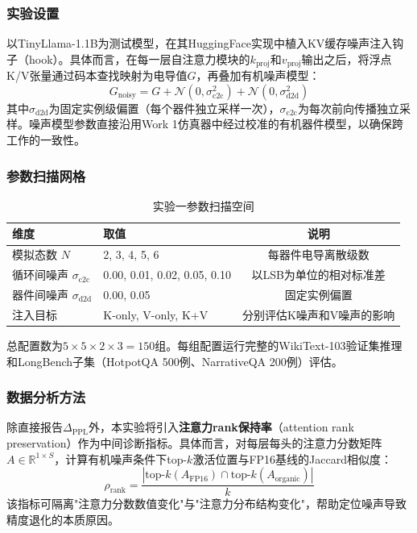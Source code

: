 \subsubsection{实验设置}

以TinyLlama-1.1B为测试模型，在其HuggingFace实现中植入KV缓存噪声注入钩子（hook）。具体而言，在每一层自注意力模块的$k_{\text{proj}}$和$v_{\text{proj}}$输出之后，将浮点K/V张量通过码本查找映射为电导值$G$，再叠加有机噪声模型：
\begin{equation}
G_{\text{noisy}} = G + \mathcal{N}(0, \sigma_{\text{c2c}}^2) + \mathcal{N}(0, \sigma_{\text{d2d}}^2)
\label{eq:noise_model}
\end{equation}
其中$\sigma_{\text{d2d}}$为固定实例级偏置（每个器件独立采样一次），$\sigma_{\text{c2c}}$为每次前向传播独立采样。噪声模型参数直接沿用Work 1仿真器中经过校准的有机器件模型，以确保跨工作的一致性。

\subsubsection{参数扫描网格}

\begin{table}[htbp]
\centering
\caption{实验一参数扫描空间}
\label{tab:exp1_grid}
\begin{tabular}{llc}
\toprule
维度 & 取值 & 说明 \\
\midrule
模拟态数 $N$ & 2, 3, 4, 5, 6 & 每器件电导离散级数 \\
循环间噪声 $\sigma_{\text{c2c}}$ & 0.00, 0.01, 0.02, 0.05, 0.10 & 以LSB为单位的相对标准差 \\
器件间噪声 $\sigma_{\text{d2d}}$ & 0.00, 0.05 & 固定实例偏置 \\
注入目标 & K-only, V-only, K+V & 分别评估K噪声和V噪声的影响 \\
\bottomrule
\end{tabular}
\end{table}

总配置数为$5 \times 5 \times 2 \times 3 = 150$组。每组配置运行完整的WikiText-103验证集推理和LongBench子集（HotpotQA 500例、NarrativeQA 200例）评估。

\subsubsection{数据分析方法}

除直接报告$\Delta_{\text{PPL}}$外，本实验将引入\textbf{注意力rank保持率}（attention rank preservation）作为中间诊断指标。具体而言，对每层每头的注意力分数矩阵$A \in \mathbb{R}^{1 \times S}$，计算有机噪声条件下top-$k$激活位置与FP16基线的Jaccard相似度：
\begin{equation}
\rho_{\text{rank}} = \frac{|\text{top-}k(A_{\text{FP16}}) \cap \text{top-}k(A_{\text{organic}})|}{k}
\label{eq:rank_preservation}
\end{equation}
该指标可隔离"注意力分数数值变化"与"注意力分布结构变化"，帮助定位噪声导致精度退化的本质原因。

